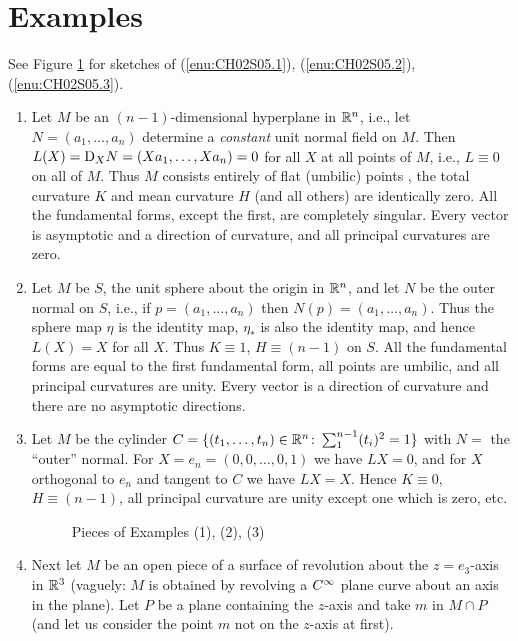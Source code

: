 \documentclass[../main]{subfiles}
\begin{document}
\section{Examples}\label{ch02:s5}

See Figure \ref{fig:ch02fig3} for sketches of (\ref{enu:CH02S05.1}), (\ref{enu:CH02S05.2}), (\ref{enu:CH02S05.3}).

\begin{enumerate}
    \item Let $M$ be an $(n-1)$-dimensional hyperplane in $\mathbb{R}^n$, i.e., let $N = (a_1,\dots,a_n)$ determine a \emph{constant} unit normal field on $M$. Then $L(X) = \mathrm{D}_XN = (Xa_1,\dots,Xa_n) = 0$ for all $X$ at all points of $M$, i.e., $L \equiv 0$ on all of $M$. Thus $M$ consists entirely of flat (umbilic) points , the total curvature $K$ and mean curvature $H$ (and all others) are identically zero. All the fundamental forms, except the first, are completely singular. Every vector is asymptotic and a direction of curvature, and all principal curvatures are zero.\label{enu:CH02S05.1}
    \item Let $M$ be $S$, the unit sphere about the origin in $\mathbb{R}^n$, and let $N$ be the outer normal on $S$, i.e., if $p=(a_1,\dots,a_n)$ then $N(p) = (a_1,\dots,a_n)$. Thus the sphere map $\eta$ is the identity map, $\eta_*$ is also the identity map, and hence $L(X) = X$ for all $X$. Thus $K\equiv 1$, $H\equiv (n-1)$ on $S$. All the fundamental forms are equal to the first fundamental form, all points are umbilic, and all principal curvatures are unity. Every vector is a direction of curvature and there are no asymptotic directions. \label{enu:CH02S05.2}
    \item Let $M$ be the cylinder $C = \{(t_1,\dots,t_n)\in\mathbb{R}^n\colon\sum_{1}^{n-1} (t_i)^2 = 1\}$ with $N =$ the ``outer'' normal. For $X = e_n = (0, 0, \dots, 0, 1)$ we have $LX = 0$, and for $X$ orthogonal to $e_n$ and tangent to $C$ we have $LX = X$. Hence $K \equiv 0$, $H\equiv (n-1)$, all principal curvature are unity except one which is zero, etc.\label{enu:CH02S05.3}
    
\begin{figure}[ht]
    \centering
    \caption{Pieces of Examples (1), (2), (3)}
    \label{fig:ch02fig3}
\end{figure}

    
    \item Next let $M$ be an open piece of a surface of revolution about the $z=e_3$-axis in $\mathbb{R}^3$ (vaguely: $M$ is obtained by revolving a $C^\infty$ plane curve about an axis in the plane). Let $P$ be a plane containing the $z$-axis and take $m$ in $M\cap P$ (and let us consider the point $m$ not on the $z$-axis at first). 
    

\end{enumerate}
\end{document}
